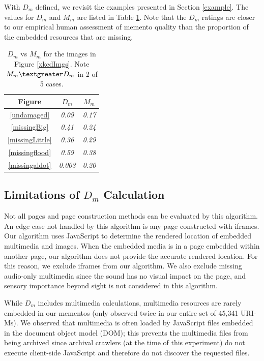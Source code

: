 With $D_m$ defined, we revisit the examples presented in Section \ref{example}. The values for $D_m$ and $M_m$ are listed in Table \ref{damageTable}. Note that the $D_m$ ratings are closer to our empirical human assessment of memento quality than the proportion of the embedded resources that are missing.

\begin{table}
\centering
\begin{tabular}{ c | c | c }
    \hline
    Figure & $D_m$ & $M_m$\\
    \hline
    \hline
\ref{undamaged} & \emph{0.09} & \emph{0.17}\\
\ref{missingBig} & \emph{0.41} & \emph{0.24}\\
\ref{missingLittle} & \emph{0.36} & \emph{0.29}\\
\ref{missingflood} & \emph{0.59} & \emph{0.38}\\
\ref{missingaldot} & \emph{0.003} & \emph{0.20}\\
    \hline
\end{tabular}
  \caption{$D_m$ vs $M_m$ for the images in Figure \ref{xkcdImgs}. Note $M_m \textgreater D_m$ in 2 of 5 cases.}
  \label{damageTable}
\end{table}

\subsection{Limitations of $D_m$ Calculation}
Not all pages and page construction methods can be evaluated by this algorithm. An edge case not handled by this algorithm is any page constructed with iframes. Our algorithm uses JavaScript to determine the rendered location of embedded multimedia and images. When the embedded media is in a page embedded within another page, our algorithm does not provide the accurate rendered location. For this reason, we exclude iframes from our algorithm. We also exclude missing audio-only multimedia since the sound has no visual impact on the page, and sensory importance beyond sight is not considered in this algorithm.

While $D_m$ includes multimedia calculations, multimedia resources are rarely embedded in our mementos (only observed twice in our entire set of 45,341 URI-Ms). We observed that multimedia is often loaded by JavaScript files embedded in the document object model (DOM); this prevents the multimedia files from being archived since archival crawlers (at the time of this experiment) do not execute client-side JavaScript and therefore do not discover the requested files.%
\\
\\
